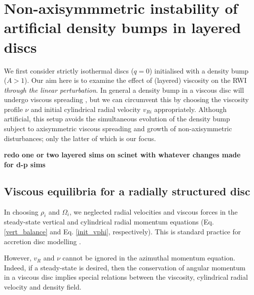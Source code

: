 \section{Non-axisymmmetric instability of artificial density bumps in
  layered discs}\label{density_bump} 
We first consider strictly isothermal discs ($q=0$) initialised with a
density bump ($A>1$). Our aim here
is to examine the effect of (layered) viscosity on the RWI 
\emph{through the linear perturbation}. 
In general a density bump in a viscous disc will undergo viscous
spreading \citep{lyndenbell74}, but we can circumvent this 
by choosing the viscosity profile $\nu$ and initial cylindrical radial
velocity $v_{Ri}$ appropriately. 
Although artificial, this setup avoids 
the simultaneous evolution of the density bump subject to
axisymmetric viscous spreading and growth of
non-axisymmetric disturbances; only the latter of which is our focus. 


{\bf redo one or two layered sims on scinet with whatever changes made for d-p sims} 

\subsection{Viscous equilibria for a radially structured
  disc}\label{visc_eq} 
 
In choosing $\rho_i$ and $\Omega_i$, we neglected radial
velocities and viscous forces in the steady-state vertical and
cylindrical radial momentum equations (Eq. \ref{vert_balance} and
Eq. \ref{init_vphi}, respectively). This is standard practice for
accretion disc modelling \citep[e.g.][]{takeuchi02}.   

However, $v_{R}$ and $\nu$ cannot be ignored in the azimuthal
momentum equation. Indeed, if a steady-state is desired, then the
conservation of angular momentum in a viscous disc implies special
relations between the viscosity, cylindrical radial velocity and
density field. %


